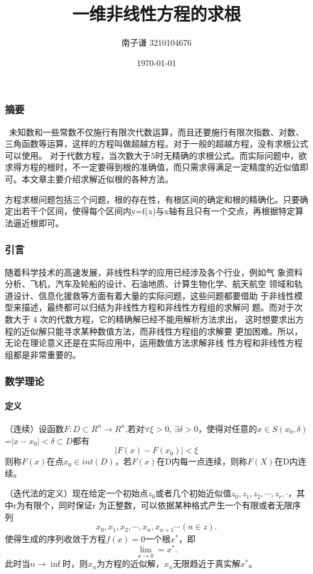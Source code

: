 \documentclass{beamer}
\title{一维非线性方程的求根}
\author{南子谦 3210104676}
\institute{信息与计算科学}
\date{\today}
\begin{document}
\begin{frame} 
\titlepage
\end{frame}


\begin{frame}
\frametitle{摘要}
\ 未知数和一些常数不仅施行有限次代数运算，而且还要施行有限次指数、对数、三角函数等运算，这样的方程叫做超越方程。对于一般的超越方程，没有求根公式可以使用。
对于代数方程，当次数大于5时无精确的求根公式。而实际问题中，欲求得方程的根时，不一定要得到根的准确值，而只需求得满足一定精度的近似值即可。本文章主要介绍求解近似根的各种方法。
\par 方程求根问题包括三个问题，根的存在性，有根区间的确定和根的精确化。只要确定出若干个区间，使得每个区间内y=f(x)与x轴有且只有一个交点，再根据特定算法逼近根即可。
\end{frame}


\begin{frame}
\frametitle{引言}
随着科学技术的高速发展，非线性科学的应用已经涉及各个行业，例如气
象资料分析、飞机，汽车及轮船的设计、石油地质、计算生物化学、航天航空
领域和轨道设计、信息化援救等方面有着大量的实际问题，这些问题都要借助
于非线性模型来描述，最终都可以归结为非线性方程和非线性方程组的求解问
题。而对于次数大于 4 次的代数方程，它的精确解已经不能用解析方法求出，
这时想要求出方程的近似解只能寻求某种数值方法，而非线性方程组的求解要
更加困难。所以，无论在理论意义还是在实际应用中，运用数值方法求解非线
性方程和非线性方程组都是非常重要的。
\end{frame}


\begin{frame}
    \frametitle{数学理论}
    \framesubtitle{定义}
    （连续）设函数$F:D \subset R^n \rightarrow R^n$,若对$\forall \xi>0$, $\exists \delta>0$，使得对任意的$x \in S(x_0,\delta)$
    =${\left|x-x_0 \right|<\delta}\subset D$都有
    \begin{equation}
    \left|F(x)-F(x_0)\right| < \xi
    \end{equation}
则称$F(x)$在点$x_0 \in int(D)$，若$F(x)$在D内每一点连续，则称$F(X)$在D内连续。
\end{frame}

\begin{frame}
    （迭代法的定义）现在给定一个初始点$z_0$或者几个初始近似值$z_0,z_1,z_2,\cdots,z_r,\cdot$，其中r为有限个，同时保证r 为正整数，可以依据某种格式产生一个有限或者无限序列
    \begin{equation}
        x_0,x_1,x_2,\cdots,x_n,x_{n+1} \cdots (n \in z).
    \end{equation}
使得生成的序列收敛于方程$f(x)=0$一个根$x^*$，即
    \begin{equation}
        \displaystyle \lim_{x \to 0}=x^*.
    \end{equation}
此时当$n\rightarrow\inf$时，则$x_n$为方程的近似解，$x_n$无限趋近于真实解$x^*$。
\end{frame}
\end{document}
